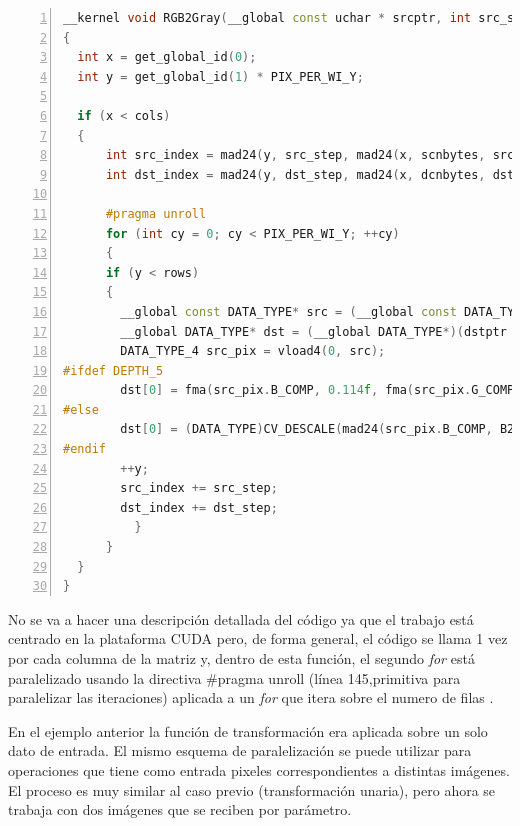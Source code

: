 \documentclass[a4paper,10pt]{report}
\begin{document}
\begin{lstlisting}[frame=bt,title={aa},caption={imgproc/src/opencl/cvtcolor.cl},
columns=fullflexible,numbers=left,backgroundcolor=\color{LemonChiffon1},basicstyle=\footnotesize,keywordstyle=\ttfamily\footnotesize,language=C++,stringstyle=\ttfamily,breaklines=true,xleftmargin=0.5em,xrightmargin=0pt,aboveskip=\bigskipamount,belowskip=\bigskipamount]
__kernel void RGB2Gray(__global const uchar * srcptr, int src_step, int src_offset, __global uchar * dstptr, int dst_step, int dst_offset, int rows, int cols)
{
  int x = get_global_id(0);
  int y = get_global_id(1) * PIX_PER_WI_Y;

  if (x < cols)
  {
      int src_index = mad24(y, src_step, mad24(x, scnbytes, src_offset));
      int dst_index = mad24(y, dst_step, mad24(x, dcnbytes, dst_offset));

      #pragma unroll
      for (int cy = 0; cy < PIX_PER_WI_Y; ++cy)
      {
	  if (y < rows)
	  {
	    __global const DATA_TYPE* src = (__global const DATA_TYPE*)(srcptr + src_index);
	    __global DATA_TYPE* dst = (__global DATA_TYPE*)(dstptr + dst_index);
	    DATA_TYPE_4 src_pix = vload4(0, src);
#ifdef DEPTH_5
	    dst[0] = fma(src_pix.B_COMP, 0.114f, fma(src_pix.G_COMP, 0.587f, src_pix.R_COMP * 0.299f));
#else
	    dst[0] = (DATA_TYPE)CV_DESCALE(mad24(src_pix.B_COMP, B2Y, mad24(src_pix.G_COMP, G2Y, mul24(src_pix.R_COMP, R2Y))), yuv_shift);
#endif
	    ++y;
	    src_index += src_step;
	    dst_index += dst_step;
          }
      }
  }
}
\end{lstlisting}


No se va a hacer una descripción detallada del código ya que el trabajo está centrado en la plataforma CUDA pero, de forma general, el código se llama 1 vez por cada columna de la matriz y, dentro de esta función, el segundo \textit{for} está paralelizado usando la directiva \#pragma unroll (línea 145,primitiva para paralelizar las iteraciones) aplicada a un \textit{for} que itera sobre el numero de filas .







En el ejemplo anterior la función de transformación era aplicada sobre un solo dato de entrada. 
El mismo esquema de paralelización se puede utilizar para operaciones que tiene como entrada pixeles correspondientes a distintas imágenes. 
El proceso es muy similar al caso previo (transformación unaria), pero ahora se trabaja con dos imágenes que se reciben por parámetro. 
\end{document}
